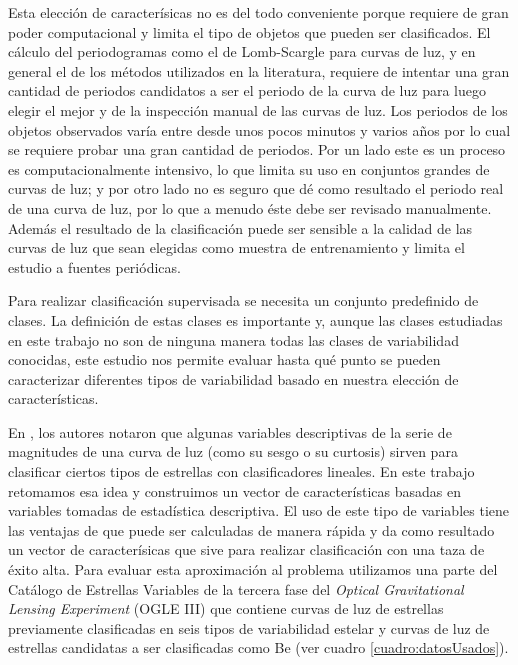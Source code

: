 \documentclass[letterpaper,12pt]{book}
\begin{document}
Esta elección de caracterísicas no es del todo conveniente porque requiere de gran poder computacional y limita el tipo de objetos que pueden ser clasificados. El cálculo del periodogramas como el de Lomb-Scargle para curvas de luz, y en general el de los métodos utilizados en la literatura, requiere de intentar una gran cantidad de periodos candidatos a ser el periodo de la curva de luz para luego elegir el mejor y de la inspección manual de las curvas de luz. Los periodos de los objetos observados varía entre desde unos pocos minutos y varios años por lo cual se requiere probar una gran cantidad de periodos. Por un lado este es un proceso es computacionalmente intensivo, lo que limita su uso en conjuntos grandes de curvas de luz; y por otro lado no es seguro que dé como resultado el periodo real de una curva de luz, por lo que a menudo éste debe ser revisado manualmente. Además el resultado de la clasificación puede ser sensible a la calidad de las curvas de luz que sean elegidas como muestra de entrenamiento \cite{debosscher_automated_2007} y limita el estudio a fuentes periódicas. 

Para realizar clasificación supervisada se necesita un conjunto predefinido de clases. La definición de estas clases es importante y, aunque las clases estudiadas en este trabajo no son de ninguna manera todas las clases de variabilidad conocidas, este estudio nos permite evaluar hasta qué punto se pueden caracterizar diferentes tipos de variabilidad basado en nuestra elección de características. 

En \cite{rodriguez_feliciano_alisis_2012, sabogal_search_2014}, los autores notaron que algunas variables descriptivas de la serie de magnitudes de una curva de luz (como su sesgo o su curtosis) sirven para clasificar ciertos tipos de estrellas con clasificadores lineales. En este trabajo retomamos esa idea y construimos un vector de características basadas en variables tomadas de estadística descriptiva. El uso de este tipo de variables tiene las ventajas de que puede ser calculadas de manera rápida y da como resultado un vector de caracterísicas que sive para realizar clasificación con una taza de éxito alta. Para evaluar esta aproximación al problema utilizamos una parte del Catálogo de Estrellas Variables de la tercera fase del \textit{Optical Gravitational Lensing Experiment} (OGLE III)\cite{soszynski_optical_2011-2,soszynski_optical_2010,soszynski_optical_2009-1,soszynski_optical_2011,soszynski_optical_2010-2,soszynski_optical_2008-1,soszynski_optical_2013-1,soszynski_optical_2011-1,soszynski_optical_2009,pawlak_eclipsing_2013,graczyk_optical_2011,poleski_optical_2010,soszynski_optical_2013,soszynski_optical_2010-1,soszynski_optical_2008} que contiene curvas de luz  de estrellas previamente clasificadas en seis tipos de variabilidad estelar y curvas de luz de estrellas candidatas a ser clasificadas como Be (ver cuadro \ref{cuadro:datosUsados}).
\end{document}
